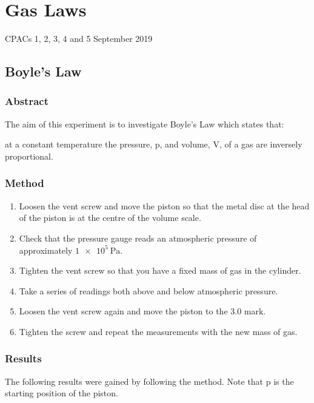 \section{Gas Laws}
CPACs 1, 2, 3, 4 and 5
\hfill
{} September 2019

\subsection{Boyle's Law}
\subsubsection{Abstract}
The aim of this experiment is to investigate Boyle's Law which states that:
\begin{quoting}
  at a constant temperature the pressure, p, and volume, V, of a gas are inversely proportional.
\end{quoting}

\subsubsection{Method}
\begin{enumerate}
  \item Loosen the vent screw and move the piston so that the metal disc at the head of the piston is at the centre of the volume scale.
  \item Check that the pressure gauge reads an atmospheric pressure of approximately $\SI{1e5}{\pascal}$.
  \item Tighten the vent screw so that you have a fixed mass of gas in the cylinder.
  \item Take a series of readings both above and below atmospheric pressure.
  \item Loosen the vent screw again and move the piston to the 3.0 mark.
  \item Tighten the screw and repeat the measurements with the new mass of gas.
\end{enumerate}

\subsubsection{Results}
The following results were gained by following the method.
Note that p is the starting position of the piston.

